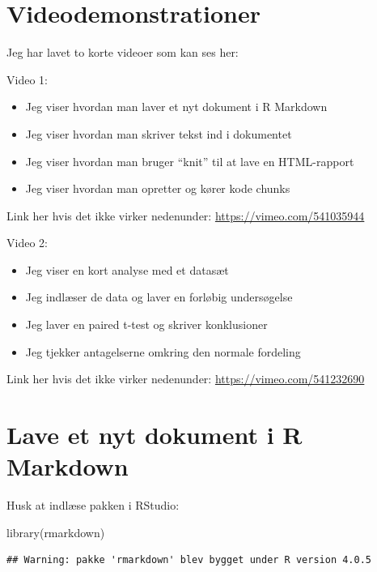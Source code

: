 \documentclass[
]{book}
\newenvironment{Shaded}{\begin{snugshade}}{\end{snugshade}}
\newcommand{\FunctionTok}[1]{\textcolor[rgb]{0.00,0.00,0.00}{#1}}
\newcommand{\NormalTok}[1]{#1}
\providecommand{\tightlist}{%
  \setlength{\itemsep}{0pt}\setlength{\parskip}{0pt}}
\begin{document}
\hypertarget{videodemonstrationer}{%
\section{Videodemonstrationer}\label{videodemonstrationer}}

Jeg har lavet to korte videoer som kan ses her:

Video 1:

\begin{itemize}
\tightlist
\item
  Jeg viser hvordan man laver et nyt dokument i R Markdown
\item
  Jeg viser hvordan man skriver tekst ind i dokumentet
\item
  Jeg viser hvordan man bruger ``knit'' til at lave en HTML-rapport
\item
  Jeg viser hvordan man opretter og kører kode chunks
\end{itemize}

Link her hvis det ikke virker nedenunder: \url{https://vimeo.com/541035944}

Video 2:

\begin{itemize}
\tightlist
\item
  Jeg viser en kort analyse med et datasæt
\item
  Jeg indlæser de data og laver en forløbig undersøgelse
\item
  Jeg laver en paired t-test og skriver konklusioner
\item
  Jeg tjekker antagelserne omkring den normale fordeling
\end{itemize}

Link her hvis det ikke virker nedenunder: \url{https://vimeo.com/541232690}

\hypertarget{lave-et-nyt-dokument-i-r-markdown}{%
\section{Lave et nyt dokument i R Markdown}\label{lave-et-nyt-dokument-i-r-markdown}}

Husk at indlæse pakken i RStudio:

\begin{Shaded}
\begin{Highlighting}[]
\FunctionTok{library}\NormalTok{(rmarkdown)}
\end{Highlighting}
\end{Shaded}

\begin{verbatim}
## Warning: pakke 'rmarkdown' blev bygget under R version 4.0.5
\end{verbatim}
\end{document}
